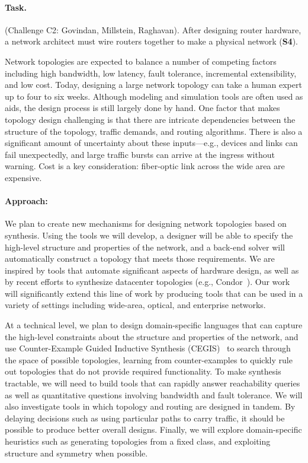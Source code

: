 \paragraph*{Task.} (Challenge C2: Govindan, Millstein, Raghavan). After designing
router hardware, a network architect must wire routers together to
make a physical network ({\bf S4}).
%

Network topologies are expected to balance a number of competing
factors including high bandwidth, low latency, fault tolerance,
incremental extensibility, and low cost. Today, designing a large
network topology can take a human expert up to four to six
weeks. Although modeling and simulation tools are often used as aids,
the design process is still largely done by hand. One factor that
makes topology design challenging is that there are intricate
dependencies between the structure of the topology, traffic demands,
and routing algorithms. There is also a significant amount of
uncertainty about these inputs---e.g., devices and links can fail
unexpectedly, and large traffic bursts can arrive at the ingress
without warning. Cost is a key consideration: fiber-optic link across
the wide area are expensive.

\paragraph*{Approach:}
%
We plan to create new mechanisms for designing network topologies
based on synthesis. Using the tools we will develop, a designer will
be able to specify the high-level structure and properties of the
network, and a back-end solver will automatically construct a topology
that meets those requirements. We are inspired by tools that automate
significant aspects of hardware design, as well as by recent efforts
to synthesize datacenter topologies (e.g., Condor~\cite{condor}). Our
work will significantly extend this line of work by producing tools
that can be used in a variety of settings including wide-area,
optical, and enterprise networks.

At a technical level, we plan to design domain-specific languages that
can capture the high-level constraints about the structure and
properties of the network, and use Counter-Example Guided Inductive
Synthesis (CEGIS)~\cite{sketch} to search through the space of possible topologies,
learning from counter-examples to quickly rule out topologies that do
not provide required functionality. To make synthesis tractable, we
will need to build tools that can rapidly answer reachability queries
as well as quantitative questions involving bandwidth and fault
tolerance. We will also investigate tools in which topology and
routing are designed in tandem. By delaying decisions such as using
particular paths to carry traffic, it should be possible to produce
better overall designs. Finally, we will explore domain-specific
heuristics such as generating topologies from a fixed class, and
exploiting structure and symmetry when possible.

